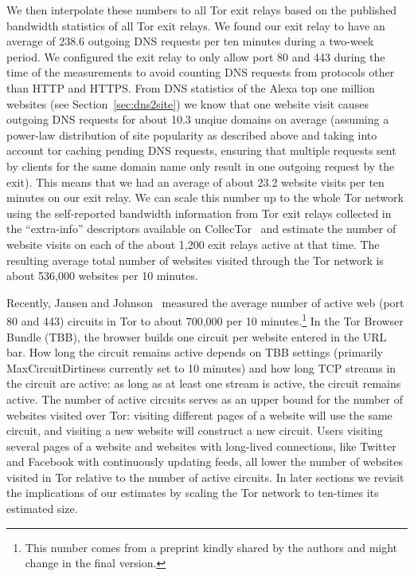 We then interpolate these numbers to all Tor exit relays based on the published
bandwidth statistics of all Tor exit relays. We found our exit relay to have an
average of 238.6 outgoing DNS requests per ten minutes during a two-week period.
We configured the exit relay to only allow port 80 and 443 during the time
of the measurements to avoid counting DNS requests from protocols other than
HTTP and HTTPS. %
From DNS statistics of the Alexa top one million websites (see
Section~\ref{sec:dns2site}) we know that one website visit causes outgoing DNS requests for about 10.3 unqiue domains on average
(assuming a power-law distribution of site popularity as described above and
taking into account tor caching pending DNS requests, ensuring that multiple
requests sent by clients for the same domain name only result in one outgoing request
by the exit).
This means that we had an average of about 23.2 website visits per ten 
minutes on our exit relay. We can scale this number up to the whole Tor
network using the self-reported bandwidth information from Tor exit
relays collected in the ``extra-info'' descriptors available on
CollecTor~\cite{collector} and estimate the number of website visits on
each of the about 1,200 exit relays active at that time. The resulting average
total number of websites visited through the Tor network is about 536,000
websites per 10 minutes.

Recently, Jansen and Johnson~\cite{jansen-ccs2016} measured the average
number of active web (port 80 and 443) circuits in Tor to about 700,000 per 10
minutes.\footnote{This number comes from a preprint kindly
shared by the authors and might change in the final version.}
In the Tor Browser Bundle (TBB), the browser builds one circuit per
website entered in the URL bar. How long the circuit remains active depends on
TBB settings (primarily MaxCircuitDirtiness currently set to 10 minutes) and how
long TCP streams in the circuit are active: as long as at least one stream is
active, the circuit remains active. The number of active circuits serves as an
upper bound for the number of websites visited over Tor: visiting different
pages of a website will use the same circuit, and visiting a new website will
construct a new circuit. Users visiting several pages of a website and websites
with long-lived connections, like Twitter and Facebook with continuously
updating feeds,
all lower the number of websites visited in Tor relative to the number of active
circuits. In later sections we revisit the implications of our estimates by
scaling the Tor network to ten-times its estimated size.

